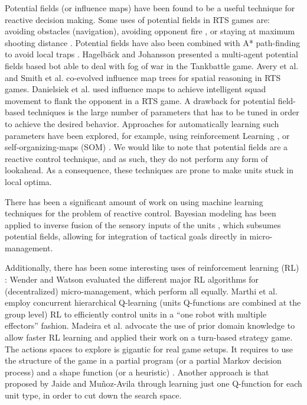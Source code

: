 \documentclass[journal]{IEEEtran}
\begin{document}
Potential fields (or influence maps) have been found to be a useful technique for reactive decision making. Some uses of potential fields in RTS games are: avoiding obstacles (navigation), avoiding opponent fire \cite{uriarte2012kiting}, or staying at maximum shooting distance \cite{Hagelback09}. Potential fields have also been combined with A* path-finding to avoid local traps \cite{Hagelback12}. Hagelb\"{a}ck and Johansson \cite{HagelbackJ08} presented a multi-agent potential fields based bot able to deal with fog of war in the Tankbattle game. Avery et al. \cite{Avery09} and Smith et al. \cite{SmithCIG10} co-evolved influence map trees for spatial reasoning in RTS games. Danielsiek et al. \cite{Danielsiek_2008} used influence maps to achieve intelligent squad movement to flank the opponent in a RTS game. A drawback for potential field-based techniques is the large number of parameters that has to be tuned in order to achieve the desired behavior. Approaches for automatically learning such parameters have been explored, for example, using reinforcement Learning \cite{Liu_2008}, or self-organizing-maps (SOM) \cite{teamCompositionRTS}. We would like to note that potential fields are a reactive control technique, and as such, they do not perform any form of lookahead. As a consequence, these techniques are prone to make units stuck in local optima. 


There has been a significant amount of work on using machine learning techniques for the problem of reactive control. Bayesian modeling has been applied to inverse fusion of the sensory inputs of the units \cite{SynnaeveMicroCig11}, which subsumes potential fields, allowing for integration of tactical goals directly in micro-management. 

Additionally, there has been some interesting uses of reinforcement learning (RL) \cite{Sutton}: 
Wender and Watson \cite{WenderRL} evaluated the different major RL algorithms for (decentralized) micro-management, which perform all equally. Marthi et al. \cite{Marthi05} employ concurrent hierarchical Q-learning (units Q-functions are combined at the group level) RL to efficiently control units in a ``one robot with multiple effectors'' fashion. Madeira et al. \cite{Madeira06} advocate the use of prior domain knowledge to allow faster RL learning and applied their work on a turn-based strategy game. The actions spaces to explore is gigantic for real game setups. It requires to use the structure of the game in a partial program (or a partial Markov decision process) and a shape function (or a heuristic) \cite{Marthi05}. Another approach is that proposed by Jaide and Mu{\~n}oz-Avila \cite{jaidee2012classq} through learning just one Q-function for each unit type, in order to cut down the search space. 
\end{document}
